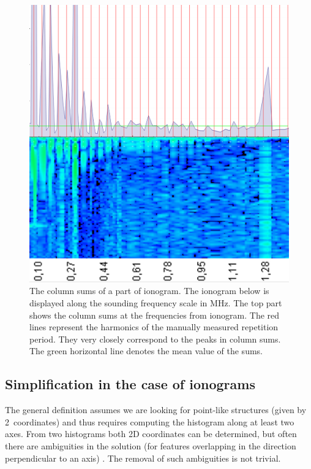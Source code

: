 \begin{figure}
	\centering
	\includegraphics[width=140mm]{images/column_sums_orbit_3974_000.png}
	\caption{The column sums of a part of ionogram. The ionogram below is displayed along the sounding frequency scale in MHz. The top part shows the column sums at the frequencies from ionogram. The red lines represent the harmonics of the manually measured repetition period. They very closely correspond to the peaks in column sums. The green horizontal line denotes the mean value of the sums.}
	\label{fig:colSums}
\end{figure}

\subsection{Simplification in the case of ionograms}
The general definition assumes we are looking for point-like structures (given by 2~coordinates) and thus requires computing the histogram along at least two axes. From two histograms both 2D coordinates can be determined, but often there are ambiguities in the solution (for features overlapping in the direction perpendicular to an axis) \citep[chap.~13]{Davies2004}. The removal of such ambiguities is not trivial. 

